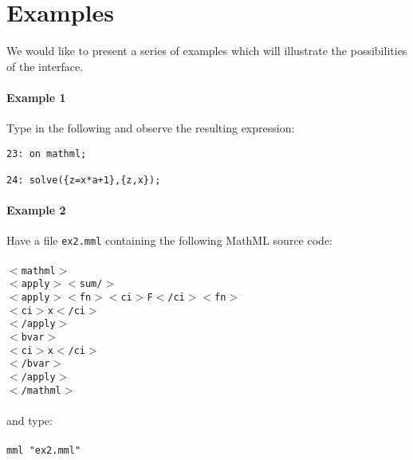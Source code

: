 \documentclass{article}
\begin{document}
\section{Examples}

We would like to present a series of examples which will illustrate the
possibilities of the interface.

\paragraph{Example 1} Type in the following and observe the resulting
expression:

\begin{verbatim}
23: on mathml;

24: solve({z=x*a+1},{z,x});
\end{verbatim}
\paragraph{Example 2}Have a file {\tt ex2.mml} containing the following
MathML source code:\\
\\
{\tt                 $<$mathml$>$\\
\hspace*{1mm}      $<$apply$>$$<$sum/$>$\\
\hspace*{5mm}       $<$apply$>$$<$fn$>$$<$ci$>$F$<$/ci$>$$<$fn$>$\\
\hspace*{9mm}         $<$ci$>$x$<$/ci$>$\\
\hspace*{5mm}       $<$/apply$>$\\
\hspace*{5mm}       $<$bvar$>$\\
\hspace*{9mm}         $<$ci$>$x$<$/ci$>$\\
\hspace*{5mm}       $<$/bvar$>$\\
\hspace*{1mm}      $<$/apply$>$\\
                  $<$/mathml$>$\\}
\\
and type:\\
\\
{\tt mml "ex2.mml"}
\end{document}
